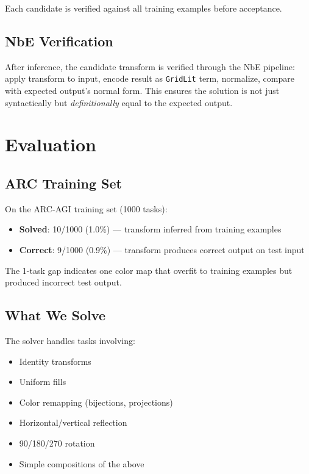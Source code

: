 \documentclass[11pt,a4paper]{article}
\begin{document}
Each candidate is verified against all training examples before
acceptance.

\subsection{NbE Verification}

After inference, the candidate transform is verified through the
NbE pipeline: apply transform to input, encode result as
\texttt{GridLit} term, normalize, compare with expected output's
normal form.  This ensures the solution is not just syntactically
but \emph{definitionally} equal to the expected output.

\section{Evaluation}
\label{sec:eval}

\subsection{ARC Training Set}

On the ARC-AGI training set (1000 tasks):
\begin{itemize}[nosep]
  \item \textbf{Solved}: 10/1000 (1.0\%) --- transform inferred from
    training examples
  \item \textbf{Correct}: 9/1000 (0.9\%) --- transform produces
    correct output on test input
\end{itemize}

The 1-task gap indicates one color map that overfit to training
examples but produced incorrect test output.

\subsection{What We Solve}

The solver handles tasks involving:
\begin{itemize}[nosep]
  \item Identity transforms
  \item Uniform fills
  \item Color remapping (bijections, projections)
  \item Horizontal/vertical reflection
  \item 90\textdegree/180\textdegree/270\textdegree{} rotation
  \item Simple compositions of the above
\end{itemize}
\end{document}
